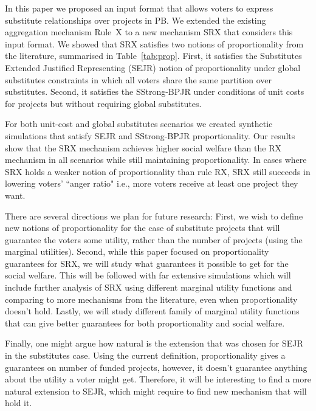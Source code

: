 \documentclass[runningheads]{llncs}
\newcommand{\kibitz}[2]{\ifnum\Comments=1{\color{#1}{#2}}\fi}
\newcommand{\rf}[1]{\kibitz{blue}{[Roy says:#1]}}
\begin{document}
In this paper we proposed an input format that allows  voters to express substitute relationships over projects in PB.  
We extended the existing aggregation mechanism  Rule~X  to a new mechanism  SRX  that considers this input format. 
We showed that   SRX satisfies two notions of proportionality from the literature, summarised in Table~\ref{tab:prop}. First, it satisfies the Substitutes Extended Justified Representing (SEJR) notion of proportionality \cite{peters2020proportional} under global substitutes constraints in which all voters share the same partition over substitutes. Second,  it satisfies the SStrong-BPJR \cite{aziz2017proportionally} under conditions of    unit costs for projects but without requiring global substitutes. 

For both unit-cost and global substitutes scenarios  we created synthetic simulations that  satisfy   SEJR and SStrong-BPJR   proportionality. Our results show that the  SRX mechanism    achieves higher social welfare  than the RX mechanism in all scenarios while still maintaining  proportionality. In cases where SRX holds a weaker notion of proportionality than rule RX, SRX  still succeeds in lowering voters' ``anger ratio" i.e.,   more voters receive at least one project they want.

There are several directions we plan for future research:
First, we wish to define new notions of  proportionality for the case of substitute projects that will guarantee the voters some utility, rather than the  number of projects (using the marginal utilities).
Second, while this paper focused on proportionality guarantees for SRX, we will study what guarantees it possible to get for the social welfare.
This will be followed with far extensive simulations which will include further analysis of SRX using different marginal utility functions and comparing to more mechanisms from the literature, even when proportionality doesn't hold.
Lastly, we will study different family of marginal utility functions that can give better guarantees for both proportionality and social welfare.

\rf{Added the paragraph about the EJR extension}
Finally, one might argue how natural is the extension that was chosen for SEJR in the substitutes case. Using the current definition, proportionality gives a guarantees on number of funded projects, however, it doesn't guarantee anything about the utility a voter might get. Therefore, it will be interesting to find a more natural extension to SEJR, which might require to find new mechanism that will hold it.
\end{document}
